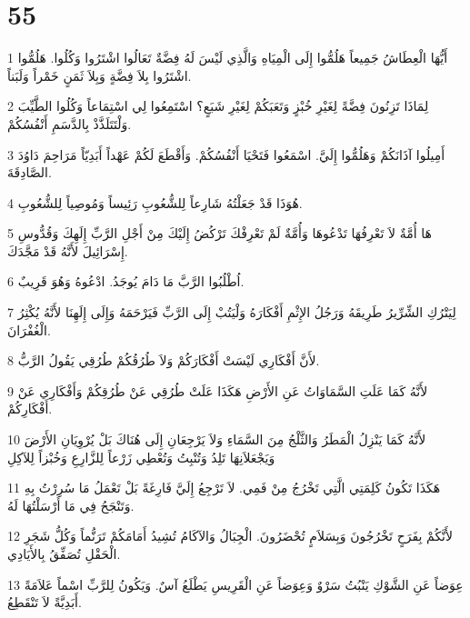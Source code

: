 \chapter{55}

\par 1 أَيُّهَا الْعِطَاشُ جَمِيعاً هَلُمُّوا إِلَى الْمِيَاهِ وَالَّذِي لَيْسَ لَهُ فِضَّةٌ تَعَالُوا اشْتَرُوا وَكُلُوا. هَلُمُّوا اشْتَرُوا بِلاَ فِضَّةٍ وَبِلاَ ثَمَنٍ خَمْراً وَلَبَناً.
\par 2 لِمَاذَا تَزِنُونَ فِضَّةً لِغَيْرِ خُبْزٍ وَتَعَبَكُمْ لِغَيْرِ شَبَعٍ؟ اسْتَمِعُوا لِي اسْتِمَاعاً وَكُلُوا الطَّيِّبَ وَلْتَتَلَذَّذْ بِالدَّسَمِ أَنْفُسُكُمْ.
\par 3 أَمِيلُوا آذَانَكُمْ وَهَلُمُّوا إِلَيَّ. اسْمَعُوا فَتَحْيَا أَنْفُسُكُمْ. وَأَقْطَعَ لَكُمْ عَهْداً أَبَدِيّاً مَرَاحِمَ دَاوُدَ الصَّادِقَةَ.
\par 4 هُوَذَا قَدْ جَعَلْتُهُ شَارِعاً لِلشُّعُوبِ رَئِيساً وَمُوصِياً لِلشُّعُوبِ.
\par 5 هَا أُمَّةٌ لاَ تَعْرِفُهَا تَدْعُوهَا وَأُمَّةٌ لَمْ تَعْرِفْكَ تَرْكُضُ إِلَيْكَ مِنْ أَجْلِ الرَّبِّ إِلَهِكَ وَقُدُّوسِ إِسْرَائِيلَ لأَنَّهُ قَدْ مَجَّدَكَ.
\par 6 اُطْلُبُوا الرَّبَّ مَا دَامَ يُوجَدُ. ادْعُوهُ وَهُوَ قَرِيبٌ.
\par 7 لِيَتْرُكِ الشِّرِّيرُ طَرِيقَهُ وَرَجُلُ الإِثْمِ أَفْكَارَهُ وَلْيَتُبْ إِلَى الرَّبِّ فَيَرْحَمَهُ وَإِلَى إِلَهِنَا لأَنَّهُ يُكْثِرُ الْغُفْرَانَ.
\par 8 لأَنَّ أَفْكَارِي لَيْسَتْ أَفْكَارَكُمْ وَلاَ طُرُقُكُمْ طُرُقِي يَقُولُ الرَّبُّ.
\par 9 لأَنَّهُ كَمَا عَلَتِ السَّمَاوَاتُ عَنِ الأَرْضِ هَكَذَا عَلَتْ طُرُقِي عَنْ طُرُقِكُمْ وَأَفْكَارِي عَنْ أَفْكَارِكُمْ.
\par 10 لأَنَّهُ كَمَا يَنْزِلُ الْمَطَرُ وَالثَّلْجُ مِنَ السَّمَاءِ وَلاَ يَرْجِعَانِ إِلَى هُنَاكَ بَلْ يُرْوِيَانِ الأَرْضَ وَيَجْعَلاَنِهَا تَلِدُ وَتُنْبِتُ وَتُعْطِي زَرْعاً لِلزَّارِعِ وَخُبْزاً لِلآكِلِ
\par 11 هَكَذَا تَكُونُ كَلِمَتِي الَّتِي تَخْرُجُ مِنْ فَمِي. لاَ تَرْجِعُ إِلَيَّ فَارِغَةً بَلْ تَعْمَلُ مَا سُرِرْتُ بِهِ وَتَنْجَحُ فِي مَا أَرْسَلْتُهَا لَهُ.
\par 12 لأَنَّكُمْ بِفَرَحٍ تَخْرُجُونَ وَبِسَلاَمٍ تُحْضَرُونَ. الْجِبَالُ وَالآكَامُ تُشِيدُ أَمَامَكُمْ تَرَنُّماً وَكُلُّ شَجَرِ الْحَقْلِ تُصَفِّقُ بِالأَيَادِي.
\par 13 عِوَضاً عَنِ الشَّوْكِ يَنْبُتُ سَرْوٌ وَعِوَضاً عَنِ الْقَرِيسِ يَطْلَعُ آسٌ. وَيَكُونُ لِلرَّبِّ اسْماً عَلاَمَةً أَبَدِيَّةً لاَ تَنْقَطِعُ.

